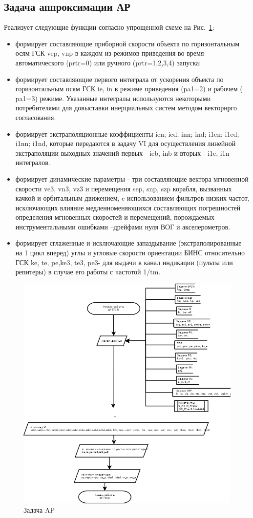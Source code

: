 \subsection{Задача аппроксимации АР}
Реализует следующие функции согласно упрощенной схеме на Рис.~\ref{fig:AP}:
\begin{itemize}
    \item формирует  составляющие приборной скорости объекта по горизонтальным  осям ГСК  vep, vnp  в  каждом из режимов  приведения  во  время  
    автоматического  (prtr=0)  или ручного (prtr=1,2,3,4)   запуска:
    \item формирует  составляющие  первого  интеграла от ускорения объекта  по  горизонтальным  осям ГСК ie, in в режиме   
    приведения  (pa1=2) и рабочем ( pa1=3) режиме. Указанные интегралы используются некоторыми потребителями  для  довыставки 
    инерциальных  систем  методом векторнрго согласования.
    \item формирует   экстраполяционные  коэффициенты ien; ied; inn;  ind;  i1en; i1ed; i1nn; i1nd,  
    которые  передаются  в  задачу   VI  для  осуществления  линейной  экстраполяции    выходных  значений   первых - ieb, inb  и  
    вторых - i1e, i1n  интегралов.
    \item формирует динамические  параметры - три составляющие вектора мгновенной скорости ve3,  vn3,  vz3  и перемещения sep, snp, szp корабля, 
    вызванных качкой и орбитальным движением, c использованием  фильтров  низких частот,  исключающих влияние медленноменяющихся составляющих  
    погрешностей   определения мгновенных скоростей и перемещений, порождаемых  инструментальными ошибками –дрейфами нуля ВОГ и акселерометров.
    \item формирует сглаженные и исключающие запаздывание (экстраполированные на 1 цикл вперед) углы и угловые скорости ориентации БИНС  
    относительно ГСК  ke, te, pe,ke3, te3, pe3- для  выдачи в  канал индикации (пульты или репитеры)  в случае  его работы с частотой 1/tm. 
\end{itemize}
\begin{figure}[H]
    \centering
    \includegraphics[width=0.75\linewidth]{images/AP_simple.png}
    \caption{Задача AP}
    \label{fig:AP}
\end{figure}

